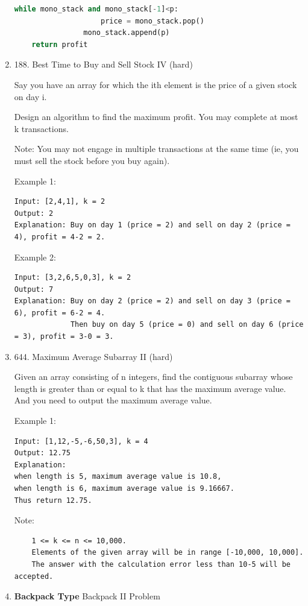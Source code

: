 \documentclass[../main.tex]{subfiles}
\begin{document}
\begin{enumerate}
\begin{lstlisting}[language = Python]
                while mono_stack and mono_stack[-1]<p:
                    price = mono_stack.pop()
                mono_stack.append(p)
    return profit
\end{lstlisting}

\item 188. Best Time to Buy and Sell Stock IV (hard)

Say you have an array for which the ith element is the price of a given stock on day i.

Design an algorithm to find the maximum profit. You may complete at most k transactions.

Note:
You may not engage in multiple transactions at the same time (ie, you must sell the stock before you buy again).

Example 1:
\begin{lstlisting}
Input: [2,4,1], k = 2
Output: 2
Explanation: Buy on day 1 (price = 2) and sell on day 2 (price = 4), profit = 4-2 = 2.
\end{lstlisting}

Example 2:
\begin{lstlisting}
Input: [3,2,6,5,0,3], k = 2
Output: 7
Explanation: Buy on day 2 (price = 2) and sell on day 3 (price = 6), profit = 6-2 = 4.
             Then buy on day 5 (price = 0) and sell on day 6 (price = 3), profit = 3-0 = 3.
\end{lstlisting}

\item 644. Maximum Average Subarray II (hard)

 Given an array consisting of n integers, find the contiguous subarray whose length is greater than or equal to k that has the maximum average value. And you need to output the maximum average value.

Example 1:
\begin{lstlisting}
Input: [1,12,-5,-6,50,3], k = 4
Output: 12.75
Explanation:
when length is 5, maximum average value is 10.8,
when length is 6, maximum average value is 9.16667.
Thus return 12.75.
\end{lstlisting}

Note:
\begin{lstlisting}
    1 <= k <= n <= 10,000.
    Elements of the given array will be in range [-10,000, 10,000].
    The answer with the calculation error less than 10-5 will be accepted.
\end{lstlisting}
\item \textbf{Backpack Type} Backpack II
Problem


\end{enumerate}
\end{document}

